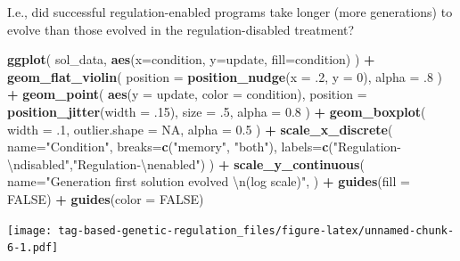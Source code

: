 \documentclass[
]{book}
\newenvironment{Shaded}{\begin{snugshade}}{\end{snugshade}}
\newcommand{\CharTok}[1]{\textcolor[rgb]{0.31,0.60,0.02}{#1}}
\newcommand{\DataTypeTok}[1]{\textcolor[rgb]{0.13,0.29,0.53}{#1}}
\newcommand{\DecValTok}[1]{\textcolor[rgb]{0.00,0.00,0.81}{#1}}
\newcommand{\FloatTok}[1]{\textcolor[rgb]{0.00,0.00,0.81}{#1}}
\newcommand{\KeywordTok}[1]{\textcolor[rgb]{0.13,0.29,0.53}{\textbf{#1}}}
\newcommand{\NormalTok}[1]{#1}
\newcommand{\OperatorTok}[1]{\textcolor[rgb]{0.81,0.36,0.00}{\textbf{#1}}}
\newcommand{\OtherTok}[1]{\textcolor[rgb]{0.56,0.35,0.01}{#1}}
\newcommand{\StringTok}[1]{\textcolor[rgb]{0.31,0.60,0.02}{#1}}
\begin{document}
I.e., did successful regulation-enabled programs take longer (more generations) to evolve than those evolved in the regulation-disabled treatment?

\begin{Shaded}
\begin{Highlighting}[]
\KeywordTok{ggplot}\NormalTok{( sol\_data, }\KeywordTok{aes}\NormalTok{(}\DataTypeTok{x=}\NormalTok{condition, }\DataTypeTok{y=}\NormalTok{update, }\DataTypeTok{fill=}\NormalTok{condition) ) }\OperatorTok{+}
\StringTok{  }\KeywordTok{geom\_flat\_violin}\NormalTok{(}
    \DataTypeTok{position =} \KeywordTok{position\_nudge}\NormalTok{(}\DataTypeTok{x =} \FloatTok{.2}\NormalTok{, }\DataTypeTok{y =} \DecValTok{0}\NormalTok{),}
    \DataTypeTok{alpha =} \FloatTok{.8}
\NormalTok{  ) }\OperatorTok{+}
\StringTok{  }\KeywordTok{geom\_point}\NormalTok{(}
    \KeywordTok{aes}\NormalTok{(}\DataTypeTok{y =}\NormalTok{ update, }\DataTypeTok{color =}\NormalTok{ condition),}
    \DataTypeTok{position =} \KeywordTok{position\_jitter}\NormalTok{(}\DataTypeTok{width =} \FloatTok{.15}\NormalTok{),}
    \DataTypeTok{size =} \FloatTok{.5}\NormalTok{,}
    \DataTypeTok{alpha =} \FloatTok{0.8}
\NormalTok{  ) }\OperatorTok{+}
\StringTok{  }\KeywordTok{geom\_boxplot}\NormalTok{(}
    \DataTypeTok{width =} \FloatTok{.1}\NormalTok{,}
    \DataTypeTok{outlier.shape =} \OtherTok{NA}\NormalTok{,}
    \DataTypeTok{alpha =} \FloatTok{0.5}
\NormalTok{  ) }\OperatorTok{+}
\StringTok{  }\KeywordTok{scale\_x\_discrete}\NormalTok{(}
    \DataTypeTok{name=}\StringTok{"Condition"}\NormalTok{,}
    \DataTypeTok{breaks=}\KeywordTok{c}\NormalTok{(}\StringTok{"memory"}\NormalTok{, }\StringTok{"both"}\NormalTok{),}
    \DataTypeTok{labels=}\KeywordTok{c}\NormalTok{(}\StringTok{"Regulation{-}}\CharTok{\textbackslash{}n}\StringTok{disabled"}\NormalTok{,}\StringTok{"Regulation{-}}\CharTok{\textbackslash{}n}\StringTok{enabled"}\NormalTok{)}
\NormalTok{  ) }\OperatorTok{+}
\StringTok{  }\KeywordTok{scale\_y\_continuous}\NormalTok{(}
    \DataTypeTok{name=}\StringTok{"Generation first solution evolved }\CharTok{\textbackslash{}n}\StringTok{(log scale)"}\NormalTok{,}
\NormalTok{  ) }\OperatorTok{+}
\StringTok{  }\KeywordTok{guides}\NormalTok{(}\DataTypeTok{fill =} \OtherTok{FALSE}\NormalTok{) }\OperatorTok{+}
\StringTok{  }\KeywordTok{guides}\NormalTok{(}\DataTypeTok{color =} \OtherTok{FALSE}\NormalTok{)}
\end{Highlighting}
\end{Shaded}

\texttt{[image: tag-based-genetic-regulation\_files/figure-latex/unnamed-chunk-6-1.pdf]}
\end{document}
